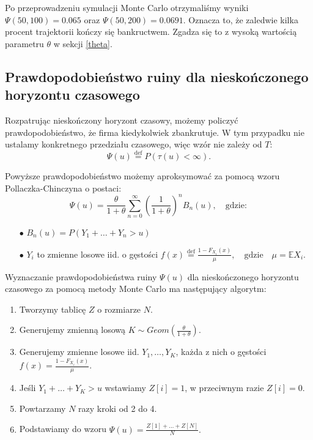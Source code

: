\documentclass[12pt]{mwart}
\begin{document}
	\noindent Po przeprowadzeniu symulacji Monte Carlo otrzymaliśmy wyniki $\Psi (50,100)= 0.065$ oraz $\Psi (50,200)= 0.0691$. Oznacza to, że zaledwie kilka procent trajektorii kończy się bankructwem. Zgadza się to z wysoką wartością parametru $\theta$ w sekcji \ref{theta}.
	
	
	\subsection{Prawdopodobieństwo ruiny dla nieskończonego horyzontu czasowego}
	\noindent Rozpatrując nieskończony horyzont czasowy, możemy policzyć prawdopodobieństwo, że firma kiedykolwiek zbankrutuje. W tym przypadku nie ustalamy konkretnego przedziału czasowego, więc wzór nie zależy od $T$:
	$$\Psi (u) \overset{\mathrm{def}}{=} P \left(   \tau \left( u \right) < \infty \right). 
	$$
	
	\noindent Powyższe prawdopodobieństwo możemy aproksymować za pomocą wzoru Pollaczka-Chinczyna o postaci:
	$$\Psi (u) = \frac{\theta}{1+\theta} \sum^{\infty}_{n=0} (\frac{1}{1+\theta})^n B_n(u), \quad \mathrm{gdzie:}
	$$
	\begin{itemize}
	\itemsep 1mm
		\item [$\bullet$] $B_n(u) = P(Y_1 + \ldots + Y_n > u)$
		\item [$\bullet$] $Y_i$ to zmienne losowe iid. o gęstości $f(x) \overset{\mathrm{def}}{=} \frac{1-F_{X_i}(x)}{\mu}, \quad \mathrm{gdzie} \quad \mu=\mathbb{E} X_i$.
	\end{itemize}
	
	\noindent Wyznaczanie prawdopodobieństwa ruiny $\Psi (u)$ dla nieskończonego horyzontu czasowego za pomocą metody Monte Carlo ma następujący algorytm:
	
	\begin{enumerate}
	\itemsep 2mm
		\item Tworzymy tablicę $Z$ o rozmiarze $N$.
		\item Generujemy zmienną losową $K \sim Geom(\frac{\theta}{1+\theta})$.
		\item Generujemy zmienne losowe iid. $Y_1, \ldots , Y_K$, każda z nich o gęstości $f(x)=\frac{1-F_{X_i}(x)}{\mu}$.
		\item Jeśli $Y_1 + \ldots + Y_K > u$ wstawiamy $Z[i] = 1$, w przeciwnym razie $Z[i]=0$.
		\item Powtarzamy $N$ razy kroki od 2 do 4.
		\item Podstawiamy do wzoru $\Psi (u)=\frac{Z[1]+\ldots +Z[N]}{N}.$
	\end{enumerate}
	
\end{document}

